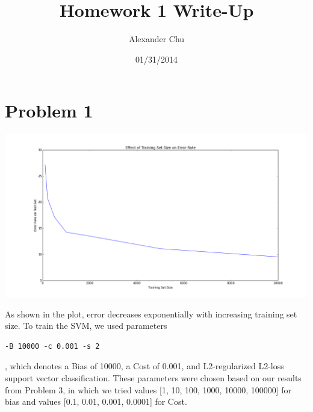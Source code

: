 \documentclass[10pt]{article}
\title{Homework 1 Write-Up}
\date{01/31/2014}
\author{Alexander Chu}
\begin{document}
\maketitle
\section{Problem 1}
\begin{center}
\includegraphics[scale=.5]{./errorPlot.png}
\end{center}
As shown in the plot, error decreases exponentially with increasing training set size.
To train the SVM, we used parameters \begin{verbatim}-B 10000 -c 0.001 -s 2\end{verbatim}, which denotes a Bias of 10000, a Cost of 0.001, and L2-regularized L2-loss support vector classification. These parameters were chosen based on our results from Problem 3, in which we tried values [1, 10, 100, 1000, 10000, 100000] for bias and values [0.1, 0.01, 0.001, 0.0001] for Cost.
\end{document}
